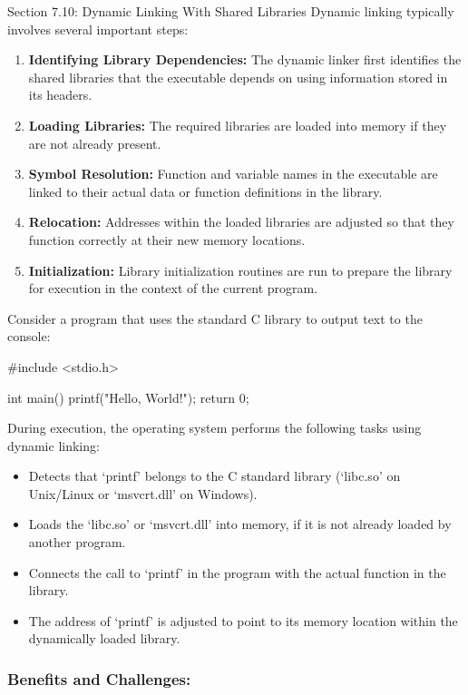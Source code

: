 \begin{notes}{Section 7.10: Dynamic Linking With Shared Libraries}
    Dynamic linking typically involves several important steps:
    \begin{enumerate}
        \item \textbf{Identifying Library Dependencies:} The dynamic linker first identifies the shared libraries that the executable depends on using information stored in its headers.
        \item \textbf{Loading Libraries:} The required libraries are loaded into memory if they are not already present.
        \item \textbf{Symbol Resolution:} Function and variable names in the executable are linked to their actual data or function definitions in the library.
        \item \textbf{Relocation:} Addresses within the loaded libraries are adjusted so that they function correctly at their new memory locations.
        \item \textbf{Initialization:} Library initialization routines are run to prepare the library for execution in the context of the current program.
    \end{enumerate}
    
    \begin{highlight}
        Consider a program that uses the standard C library to output text to the console:
    \begin{code}[C]
    #include <stdio.h>

    int main() {
        printf("Hello, World!\n");
        return 0;
    }
    \end{code}
        During execution, the operating system performs the following tasks using dynamic linking:
        \begin{itemize}
            \item Detects that `printf' belongs to the C standard library (`libc.so' on Unix/Linux or `msvcrt.dll' on Windows).
            \item Loads the `libc.so' or `msvcrt.dll' into memory, if it is not already loaded by another program.
            \item Connects the call to `printf' in the program with the actual function in the library.
            \item The address of `printf' is adjusted to point to its memory location within the dynamically loaded library.
        \end{itemize}
    \end{highlight}
    
    \subsubsection*{Benefits and Challenges:}
    

\end{notes}
